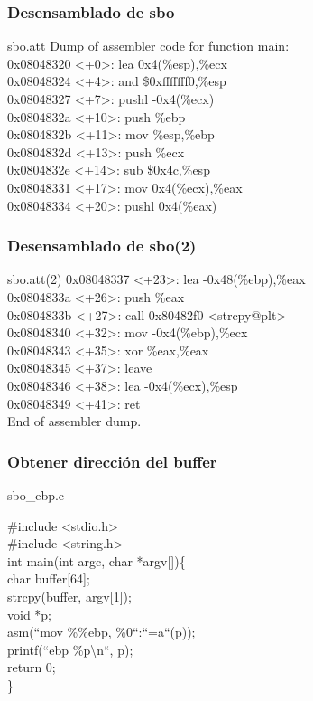 \documentclass{beamer}
\newcommand{\tab}{\hspace*{2em}}
\begin{document}
\begin{frame}
\frametitle{Desensamblado de sbo}
\begin{block}{sbo.att}
Dump of assembler code for function main:\\
   0x08048320 <+0>:	lea    0x4(\%esp),\%ecx\\
   0x08048324 <+4>:	and    \$0xfffffff0,\%esp\\
   0x08048327 <+7>:	pushl  -0x4(\%ecx)\\
   0x0804832a <+10>:	push   \%ebp\\
   0x0804832b <+11>:	mov    \%esp,\%ebp\\
   0x0804832d <+13>:	push   \%ecx\\
   0x0804832e <+14>:	sub    \$0x4c,\%esp\\
   0x08048331 <+17>:	mov    0x4(\%ecx),\%eax\\
   0x08048334 <+20>:	pushl  0x4(\%eax)\\

   \end{block}
\end{frame}

\begin{frame}
\frametitle{Desensamblado de sbo(2)}
\begin{block}{sbo.att(2)}
   0x08048337 <+23>:	lea    -0x48(\%ebp),\%eax\\
   0x0804833a <+26>:	push   \%eax\\
   0x0804833b <+27>:	call   0x80482f0 <strcpy@plt>\\
   0x08048340 <+32>:	mov    -0x4(\%ebp),\%ecx\\
   0x08048343 <+35>:	xor    \%eax,\%eax\\
   0x08048345 <+37>:	leave  \\
   0x08048346 <+38>:	lea    -0x4(\%ecx),\%esp\\
   0x08048349 <+41>:	ret    \\
End of assembler dump.

   \end{block}
\end{frame}

\begin{frame}
\frametitle{Obtener direcci\'on del buffer}
\begin{block}{sbo\_ebp.c}

\#include <stdio.h>\\
\#include <string.h>\\[0.5cm]
int main(int argc, char *argv[])\{\\
\tab char buffer[64];\\
\tab strcpy(buffer, argv[1]);\\[0.5cm]
\tab void *p;\\
\tab asm(``mov \%\%ebp, \%0``:``=a``(p));\\
\tab printf(``ebp \%p\textbackslash n``, p);\\
\tab return 0;\\
\}
   \end{block}
\end{frame}
\end{document}
